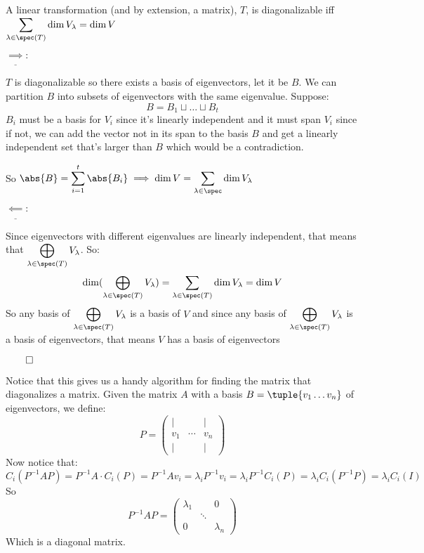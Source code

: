 \documentclass[10pt]{article}
\begin{document}
\begin{corollary}{A linear transformation (and by extension, a matrix), $T$, is diagonalizable iff $\displaystyle\sum_{\lambda\in\spec(T)}\dim V_\lambda = \dim V$} 

$\underline{\implies}:$ \begin{minipage}[t]{\dimexpr\textwidth-2cm}

$T$ is diagonalizable so there exists a basis of eigenvectors, let it be $B$. We can partition $B$ into subsets of eigenvectors with the same eigenvalue. Suppose:
\[ B = B_1 \sqcup\dots\sqcup B_t \]
$B_i$ must be a basis for $V_i$ since it's linearly independent and it must span $V_i$ since if not, we can add the vector not in its span to the basis $B$ and get a linearly independent set that's larger than $B$ which would be a contradiction. 

So $\displaystyle\abs{B} = \sum_{i=1}^t \abs{B_i} \implies \dim V = \sum_{\lambda\in\spec} \dim V_\lambda$

\end{minipage}

\medskip

$\underline{\impliedby}:$ \begin{minipage}[t]{\dimexpr\textwidth-2cm}

Since eigenvectors with different eigenvalues are linearly independent, that means that $\displaystyle\bigoplus_{\lambda\in\spec(T)} V_\lambda$. So:
\[ \dim(\bigoplus_{\lambda\in\spec(T)} V_\lambda) = \sum_{\lambda\in\spec(T)} \dim V_\lambda = \dim V \]
So any basis of $\displaystyle\bigoplus_{\lambda\in\spec(T)} V_\lambda$ is a basis of $V$ and since any basis of $\displaystyle\bigoplus_{\lambda\in\spec(T)} V_\lambda$ is a basis of eigenvectors, that means $V$ has a basis of eigenvectors

\end{minipage}

$\qed$

\end{corollary}

Notice that this gives us a handy algorithm for finding the matrix that diagonalizes a matrix. Given the matrix $A$ with a basis $B=\tuple{v_1\dots v_n}$ of eigenvectors, we define:
\[ P = \begin{pmatrix} \vert & & \vert \\ v_1 & \cdots & v_n \\ \vert & & \vert \end{pmatrix} \]
Now notice that:
\[ C_i(P^{-1}AP) = P^{-1}A\cdot C_i(P) = P^{-1}Av_i = \lambda_iP^{-1}v_i = \lambda_iP^{-1}C_i(P) = \lambda_iC_i(P^{-1}P) = \lambda_iC_i(I) \]
So 
\[ P^{-1}AP = \begin{pmatrix} \lambda_1 & & 0 \\ & \ddots & \\ 0 & & \lambda_n \end{pmatrix} \]
Which is a diagonal matrix.
\end{document}
